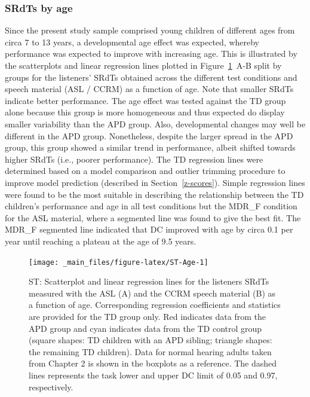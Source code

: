 \documentclass[a4paper, twoside]{templates/ociamthesis}
\begin{document}
\hypertarget{srdts-by-age}{%
\subsubsection*{SRdTs by age}\label{srdts-by-age}}

Since the present study sample comprised young children of different ages from circa 7 to 13 years, a developmental age effect was expected, whereby performance was expected to improve with increasing age. This is illustrated by the scatterplots and linear regression lines plotted in Figure~\ref{fig:ST-Age}~A-B split by groups for the listeners' SRdTs obtained across the different test conditions and speech material (ASL / CCRM) as a function of age. Note that smaller SRdTs indicate better performance. The age effect was tested against the TD group alone because this group is more homogeneous and thus expected do display smaller variability than the APD group. Also, developmental changes may well be different in the APD group. Nonetheless, despite the larger spread in the APD group, this group showed a similar trend in performance, albeit shifted towards higher SRdTs (i.e., poorer performance). The TD regression lines were determined based on a model comparison and outlier trimming procedure to improve model prediction (described in Section~\ref{z-scores}). Simple regression lines were found to be the most suitable in describing the relationship between the TD children's performance and age in all test conditions but the MDR\_F condition for the ASL material, where a segmented line was found to give the best fit. The MDR\_F segmented line indicated that DC improved with age by circa 0.1 per year until reaching a plateau at the age of 9.5 years.\\

\begin{figure}[h]

{\centering \texttt{[image: \_main\_files/figure-latex/ST-Age-1]} 

}

\caption{ST: Scatterplot and linear regression lines for the listeners SRdTs measured with the ASL (A) and the CCRM speech material (B) as a function of age. Corresponding regression coefficients and statistics are provided for the TD group only. Red indicates data from the APD group and cyan indicates data from the TD control group (square shapes: TD children with an APD sibling; triangle shapes: the remaining TD children). Data for normal hearing adults taken from Chapter 2 is shown in the boxplots as a reference. The dashed lines represents the task lower and upper DC limit of 0.05 and 0.97, respectively.}\label{fig:ST-Age}
\end{figure}
\end{document}
